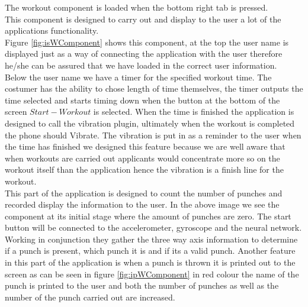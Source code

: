 \documentclass[a4paper,12pt]{report}
\begin{document}
The workout component is loaded when the bottom right tab is pressed.\\
This component is designed to carry out and display to the user a lot of the applications functionality.\\
Figure \ref{fig:isWComponent}  shows this component, at the top the user name is displayed just as a way of connecting the application with the user therefore he/she can be assured that we have loaded in the correct user information.\\
Below the user name we have a timer for the specified workout time. The costumer has the ability to chose length of time themselves, the timer outputs the time selected and starts timing down when the button at the bottom of the screen $Start-Workout$ is selected. When the time is finished the application is designed to call the vibration plugin, ultimately when the workout is completed the phone should Vibrate.
The vibration is put in as a reminder to the user when the time has finished we designed this feature because we are well aware that when workouts are carried out applicants would concentrate more so on the workout itself than the application hence the vibration is a finish line for the workout.\\

This part of the application is designed to count the number of punches and recorded display the information to the user. In the above image we see the component at its initial stage where the amount of punches are zero.
The start button will be connected to the accelerometer, gyroscope and the neural network. Working in conjunction they gather the three way axis information to determine if a punch is present, which punch it is and if its a valid punch.
Another feature in this part of the application is when a punch is thrown it is printed out to the screen as can be seen in figure  \ref{fig:ipWComponent} in red colour the name of the punch is printed to the user and both the number of punches as well as the number of the punch carried out are increased.\\
\end{document}
